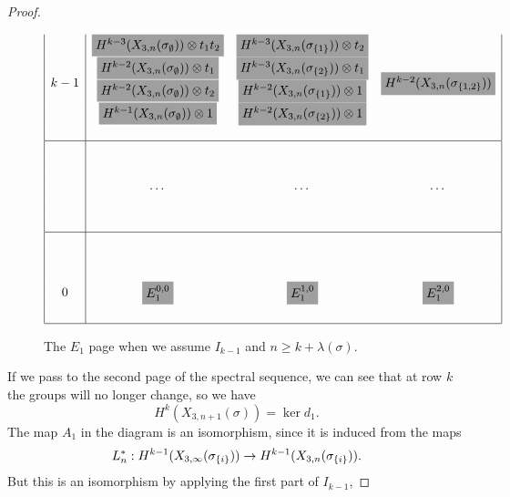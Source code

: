\begin{proof}
\begin{figure}[ht]
\[\begin{array}{|c|ccc|}
    \multirow{6}{*}{$k-1$}
    & \colorbox{isomorphism}{$H^{k-3}(X_{3,n}(\sigma_{\emptyset}))
      \otimes t_1t_2$}
    & \colorbox{isomorphism}{$H^{k-3}(X_{3,n}(\sigma_{\set{1}}))
      \otimes t_2$}
    & \multirow{6}{*}{\colorbox{isomorphism}{$
      H^{k-2}(X_{3,n}(\sigma_{\set{1,2}}))$}} \\
    & \colorbox{isomorphism}{$H^{k-2}(X_{3,n}(\sigma_{\emptyset}))
      \otimes t_1$}
    & \colorbox{isomorphism}{$H^{k-3}(X_{3,n}(\sigma_{\set{2}}))
      \otimes t_1$} &\\
    & \colorbox{isomorphism}{$H^{k-2}(X_{3,n}(\sigma_{\emptyset}))
      \otimes t_2 $}
    & \colorbox{isomorphism}{$H^{k-2}(X_{3,n}(\sigma_{\set{1}}))
      \otimes 1$}
    &\\
    & \colorbox{isomorphism}{$H^{k-1}(X_{3,n}(\sigma_{\emptyset}))
      \otimes 1$}
    & \colorbox{isomorphism}{$H^{k-2}(X_{3,n}(\sigma_{\set{2}}))
      \otimes 1$}
    &\\
    && & \\
    \hline
    & & & \\
    & \multirow{4}{*}{\dots} 
    & \multirow{4}{*}{\dots} 
    & \multirow{4}{*}{\dots} 
    \\
    & & & \\
    & & & \\
    & & & \\
    & & & \\
    \hline && & \\
    \multirow{6}{*}{$0$} 
    & \multirow{6}{*}{\colorbox{isomorphism}{$E_{1}^{0,0}$}} 
    & \multirow{6}{*}{\colorbox{isomorphism}{$E_1^{1,0}$}}
    & \multirow{6}{*}{\colorbox{isomorphism}{$E_1^{2,0}$}} \\
    & & &\\
    & & &\\
    & & &\\
    & & &\\
    \hline
    \end{array}
    \]
    \caption{The $E_1$ page when we assume $I_{k-1}$ and $n \geq
      k+\lambda(\sigma)$.}
    \label{fig:surjektiv}
\end{figure}
If we pass to the second page of the spectral sequence, we
can see that at row $k$ the groups will no longer change, so we have
\[ H^k(X_{3,n+1}(\sigma)) = \ker d_1. \]
The map $A_1$ in the diagram is an isomorphism, since it is induced from
the maps
\[ L^*_{n} : H^{k-1}(X_{3,\infty}(\sigma_{\left\{ i \right\}})) \to
H^{k-1}(X_{3,n}(\sigma_{\left\{ i \right\}})). \]
But this is an isomorphism by applying the first part of $I_{k-1}$,

\end{proof}

